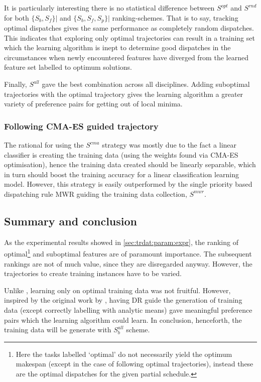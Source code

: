It is particularly interesting there is no statistical difference between 
$S^{opt}$ and $S^{rnd}$ for both $\{S_{b},S_{f}\}\big|$ and 
$\{S_b,S_f,S_p\}\big|$ ranking-schemes. That is to say, tracking 
optimal dispatches gives the same performance as completely random dispatches. 
This indicates that exploring only optimal trajectories can result in a 
training set which the learning algorithm is inept to determine good dispatches 
in the circumstances when newly encountered features have diverged from the 
learned feature set labelled to optimum solutions. 

Finally, $S^{all}$ gave the best combination across all disciplines. Adding 
suboptimal trajectories with the optimal trajectory gives the learning 
algorithm a greater variety of preference pairs for getting out of local minima.

\subsubsection{Following CMA-ES guided trajectory}
The rational for using the $S^{cma}$ strategy was mostly due to the fact a 
linear classifier is creating the training data (using the weights found via 
CMA-ES optimisation), hence the training data created should be linearly 
separable, which in turn should boost the training accuracy for a linear 
classification learning model. However, this strategy is easily outperformed by 
the single priority based dispatching rule MWR guiding the training data 
collection, $S^{mwr}$. 


\subsection{Summary and conclusion}
As the experimental results showed in \cref{sec:trdat:param:expr}, the ranking 
of optimal\footnote{Here the tasks labelled `optimal' do not necessarily yield 
    the optimum makespan (except in the case of following optimal 
    trajectories), 
    instead these are the optimal dispatches for the given partial schedule.} 
    and 
suboptimal features are of paramount importance. The subsequent rankings are 
not of much value, since they are disregarded anyway. However, the trajectories 
to create training instances have to be varied.

Unlike \citep{Siggi10,Malik08,Russell09}, learning only on optimal training 
data was not fruitful. However, inspired by the original work by 
\cite{Siggi05}, having DR guide the generation of training data (except 
correctly labelling with analytic means) gave meaningful preference pairs which 
the learning algorithm could learn. In conclusion, henceforth, the training 
data will be generate with $S_{b}^{all}$ scheme.



